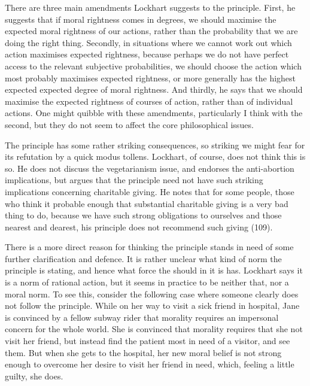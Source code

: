 \documentclass[
  10pt,
  letterpaper,
  DIV=11,
  numbers=noendperiod,
  twoside]{scrartcl}
\begin{document}
There are three main amendments Lockhart suggests to the principle.
First, he suggests that if moral rightness comes in degrees, we should
maximise the expected moral rightness of our actions, rather than the
probability that we are doing the right thing. Secondly, in situations
where we cannot work out which action maximises expected rightness,
because perhaps we do not have perfect access to the relevant subjective
probabilities, we should choose the action which most probably maximises
expected rightness, or more generally has the highest expected expected
degree of moral rightness. And thirdly, he says that we should maximise
the expected rightness of courses of action, rather than of individual
actions. One might quibble with these amendments, particularly I think
with the second, but they do not seem to affect the core philosophical
issues.

The principle has some rather striking consequences, so striking we
might fear for its refutation by a quick modus tollens. Lockhart, of
course, does not think this is so. He does not discuss the vegetarianism
issue, and endorses the anti-abortion implications, but argues that the
principle need not have such striking implications concerning charitable
giving. He notes that for some people, those who think it probable
enough that substantial charitable giving is a very bad thing to do,
because we have such strong obligations to ourselves and those nearest
and dearest, his principle does not recommend such giving (109).

There is a more direct reason for thinking the principle stands in need
of some further clarification and defence. It is rather unclear what
kind of norm the principle is stating, and hence what force the should
in it is has. Lockhart says it is a norm of rational action, but it
seems in practice to be neither that, nor a moral norm. To see this,
consider the following case where someone clearly does not follow the
principle. While on her way to visit a sick friend in hospital, Jane is
convinced by a fellow subway rider that morality requires an impersonal
concern for the whole world. She is convinced that morality requires
that she not visit her friend, but instead find the patient most in need
of a visitor, and see them. But when she gets to the hospital, her new
moral belief is not strong enough to overcome her desire to visit her
friend in need, which, feeling a little guilty, she does.
\end{document}
